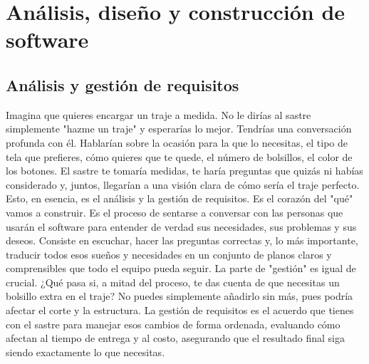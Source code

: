 \chapter{Análisis, diseño y construcción de software}
\section{Análisis y gestión de requisitos}
Imagina que quieres encargar un traje a medida. No le dirías al sastre simplemente "hazme un traje" y esperarías lo mejor. Tendrías una conversación profunda con él. Hablarían sobre la ocasión para la que lo necesitas, el tipo de tela que prefieres, cómo quieres que te quede, el número de bolsillos, el color de los botones. El sastre te tomaría medidas, te haría preguntas que quizás ni habías considerado y, juntos, llegarían a una visión clara de cómo sería el traje perfecto.
Esto, en esencia, es el análisis y la gestión de requisitos. Es el corazón del "qué" vamos a construir. Es el proceso de sentarse a conversar con las personas que usarán el software para entender de verdad sus necesidades, sus problemas y sus deseos. Consiste en escuchar, hacer las preguntas correctas y, lo más importante, traducir todos esos sueños y necesidades en un conjunto de planos claros y comprensibles que todo el equipo pueda seguir.
La parte de "gestión" es igual de crucial. ¿Qué pasa si, a mitad del proceso, te das cuenta de que necesitas un bolsillo extra en el traje? No puedes simplemente añadirlo sin más, pues podría afectar el corte y la estructura. La gestión de requisitos es el acuerdo que tienes con el sastre para manejar esos cambios de forma ordenada, evaluando cómo afectan al tiempo de entrega y al costo, asegurando que el resultado final siga siendo exactamente lo que necesitas.
